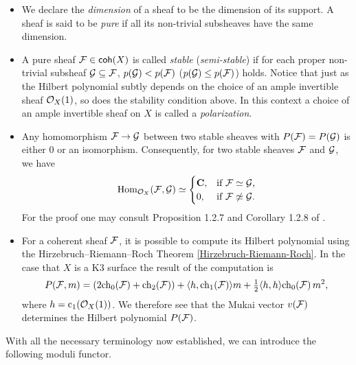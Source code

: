 \begin{itemize}[label = $\vartriangleright$]
{    }
    \item{
        We declare the \emph{dimension} of a sheaf to be the dimension of its support.
        A sheaf is said to be \emph{pure} if all its non-trivial subsheaves have the same dimension. 
    }
    \item{
        A pure sheaf $\mathcal F \in \mathsf{coh}(X)$ is called \emph{stable} (\resp \emph{semi-stable}) if for each proper non-trivial subsheaf $\mathcal G \subseteq \mathcal F$, $p(\mathcal G) < p(\mathcal F)$ (\resp $p(\mathcal G) \leq p(\mathcal F)$) holds. Notice that just as the Hilbert polynomial subtly depends on the choice 
        of an ample invertible sheaf ${\mathcal{O}_{X}}(1)$, so does the stability condition above. In this context a choice of an ample invertible sheaf on $X$ is called a \emph{polarization}.
    }
    \item{
        Any homomorphism $\mathcal F \to \mathcal G$ between two stable sheaves with $P(\mathcal F) = P(\mathcal G)$ is either $0$ or an isomorphism. Consequently, for two stable sheaves $\mathcal F$ and $\mathcal G$, we have
        \begin{equation}
            \label{eq: schur lemma for stable sheaves}
            \mathrm{Hom}_{{\mathcal{O}_{X}}}(\mathcal F, \mathcal G) \simeq \begin{cases}
                \mathbf C, &\text{if $\mathcal F \simeq \mathcal G$,} \\
                0, &\text{if $\mathcal F \not\simeq \mathcal G$.}
            \end{cases}
        \end{equation}
        For the proof one may consult Proposition 1.2.7 and Corollary 1.2.8 of \cite[\S I.1.2]{HuybrechtsLehn2010}.
    }
    \item{
        For a coherent sheaf $\mathcal F$, it is possible to compute its Hilbert polynomial using the Hirzebruch--Riemann--Roch Theorem \ref{Hirzebruch-Riemann-Roch}. In the case that $X$ is a K3 surface the result of the computation is
        \[
            P(\F, m) = (2\ch[0](\F) + \ch[2](\F)) + \pairing{h}{\ch[1](\F)}m + \tfrac{1}{2}\pairing{h}{h}\ch[0]{\F}m^2,
        \]
        where $h = \cclass[1](\struct{X}(1))$. We therefore see that the Mukai vector $v(\mathcal F)$ determines the Hilbert polynomial $P(\mathcal F)$. 
    }
\end{itemize}

\noindent
With all the necessary terminology now established, we can introduce the following moduli functor. 

